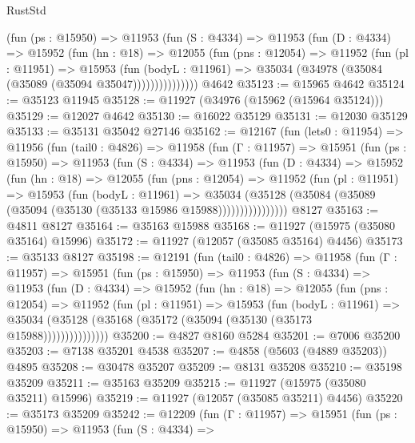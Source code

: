 \begin{lexlean}{RustStd}
\begin{coremodule}
            (fun (ps : @15950) =>
            @11953
              (fun (S : @4334) =>
              @11953
                (fun (D : @4334) =>
                @15952
                  (fun (hn : @18) =>
                  @12055
                    (fun (pns : @12054) =>
                    @11952
                      (fun (pl : @11951) =>
                      @15953
                        (fun (bodyL : @11961) =>
                        @35034 (@34978 (@35084 (@35089 (@35094 @35047)))))))))))))))
    @4642
@35123 := @15965 @4642
@35124 := @35123 @11945
@35128 := @11927 (@34976 (@15962 (@15964 @35124)))
@35129 := @12027 @4642
@35130 := @16022 @35129
@35131 := @12030 @35129
@35133 := @35131 @35042 @27146
@35162 := @12167
    (fun (lets0 : @11954) =>
    @11956
      (fun (tail0 : @4826) =>
      @11958
        (fun (Γ : @11957) =>
        @15951
          (fun (ps : @15950) =>
          @11953
            (fun (S : @4334) =>
            @11953
              (fun (D : @4334) =>
              @15952
                (fun (hn : @18) =>
                @12055
                  (fun (pns : @12054) =>
                  @11952
                    (fun (pl : @11951) =>
                    @15953
                      (fun (bodyL : @11961) =>
                      @35034
                        (@35128
                          (@35084 (@35089 (@35094 (@35130 (@35133 @15986 @15988))))))))))))))))
    @8127
@35163 := @4811 @8127
@35164 := @35163 @15988
@35168 := @11927 (@15975 (@35080 @35164) @15996)
@35172 := @11927 (@12057 (@35085 @35164) @4456)
@35173 := @35133 @8127
@35198 := @12191
    (fun (tail0 : @4826) =>
    @11958
      (fun (Γ : @11957) =>
      @15951
        (fun (ps : @15950) =>
        @11953
          (fun (S : @4334) =>
          @11953
            (fun (D : @4334) =>
            @15952
              (fun (hn : @18) =>
              @12055
                (fun (pns : @12054) =>
                @11952
                  (fun (pl : @11951) =>
                  @15953
                    (fun (bodyL : @11961) =>
                    @35034 (@35128 (@35168 (@35172 (@35094 (@35130 (@35173 @15988)))))))))))))))
@35200 := @4827 @8160 @5284
@35201 := @7006 @35200
@35203 := @7138 @35201 @4538
@35207 := @4858 (@5603 (@4889 @35203)) @4895
@35208 := @30478 @35207
@35209 := @8131 @35208
@35210 := @35198 @35209
@35211 := @35163 @35209
@35215 := @11927 (@15975 (@35080 @35211) @15996)
@35219 := @11927 (@12057 (@35085 @35211) @4456)
@35220 := @35173 @35209
@35242 := @12209
    (fun (Γ : @11957) =>
    @15951
      (fun (ps : @15950) =>
      @11953
        (fun (S : @4334) =>

\end{coremodule}
\end{lexlean}
